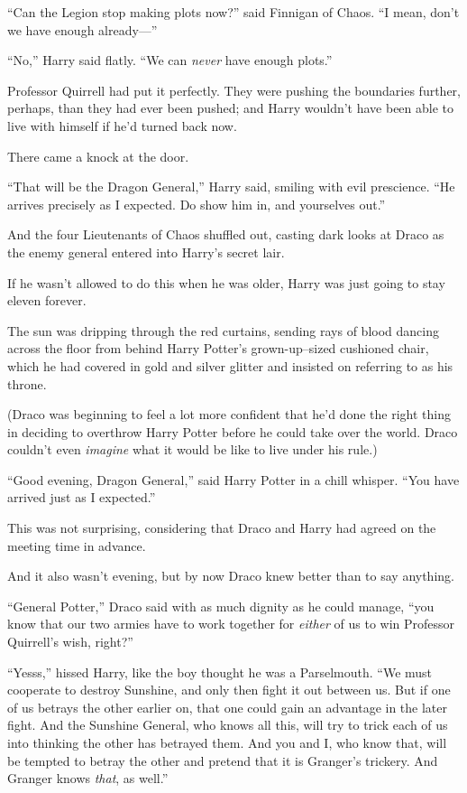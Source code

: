 “Can the Legion stop making plots now?” said Finnigan of Chaos.
“I mean, don’t we have enough already—”

“No,” Harry said flatly.
“We can \emph{never} have enough plots.”

Professor Quirrell had put it perfectly. They were pushing the boundaries further, perhaps, than they had ever been pushed; and Harry wouldn’t have been able to live with himself if he’d turned back now.

There came a knock at the door.

“That will be the Dragon General,” Harry said, smiling with evil prescience.
“He arrives precisely as I expected. Do show him in, and yourselves out.”

And the four Lieutenants of Chaos shuffled out, casting dark looks at Draco as the enemy general entered into Harry’s secret lair.

If he wasn’t allowed to do this when he was older, Harry was just going to stay eleven forever.

\later

The sun was dripping through the red curtains, sending rays of blood dancing across the floor from behind Harry Potter’s grown-up–sized cushioned chair, which he had covered in gold and silver glitter and insisted on referring to as his throne.

(Draco was beginning to feel a lot more confident that he’d done the right thing in deciding to overthrow Harry Potter before he could take over the world. Draco couldn’t even \emph{imagine} what it would be like to live under his rule.)

“Good evening, Dragon General,” said Harry Potter in a chill whisper.
“You have arrived just as I expected.”

This was not surprising, considering that Draco and Harry had agreed on the meeting time in advance.

And it also wasn’t evening, but by now Draco knew better than to say anything.

“General Potter,” Draco said with as much dignity as he could manage, “you know that our two armies have to work together for \emph{either} of us to win Professor Quirrell’s wish, right?”

“Yesss,” hissed Harry, like the boy thought he was a Parselmouth.
“We must cooperate to destroy Sunshine, and only then fight it out between us. But if one of us betrays the other earlier on, that one could gain an advantage in the later fight. And the Sunshine General, who knows all this, will try to trick each of us into thinking the other has betrayed them. And you and I, who know that, will be tempted to betray the other and pretend that it is Granger’s trickery. And Granger knows \emph{that}, as well.”

